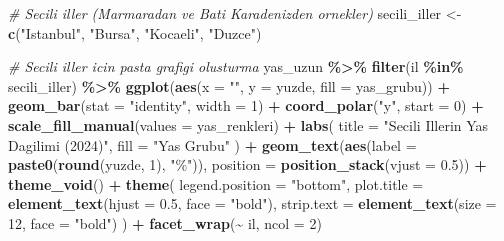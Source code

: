 \documentclass[
]{article}
\newenvironment{Shaded}{\begin{snugshade}}{\end{snugshade}}
\newcommand{\AttributeTok}[1]{\textcolor[rgb]{0.13,0.29,0.53}{#1}}
\newcommand{\CommentTok}[1]{\textcolor[rgb]{0.56,0.35,0.01}{\textit{#1}}}
\newcommand{\DecValTok}[1]{\textcolor[rgb]{0.00,0.00,0.81}{#1}}
\newcommand{\FloatTok}[1]{\textcolor[rgb]{0.00,0.00,0.81}{#1}}
\newcommand{\FunctionTok}[1]{\textcolor[rgb]{0.13,0.29,0.53}{\textbf{#1}}}
\newcommand{\NormalTok}[1]{#1}
\newcommand{\OtherTok}[1]{\textcolor[rgb]{0.56,0.35,0.01}{#1}}
\newcommand{\SpecialCharTok}[1]{\textcolor[rgb]{0.81,0.36,0.00}{\textbf{#1}}}
\newcommand{\StringTok}[1]{\textcolor[rgb]{0.31,0.60,0.02}{#1}}
\begin{document}
\begin{Shaded}
\begin{Highlighting}[]
\CommentTok{\# Secili iller (Marmara\textquotesingle{}dan ve Bati Karadeniz\textquotesingle{}den ornekler)}
\NormalTok{secili\_iller }\OtherTok{\textless{}{-}} \FunctionTok{c}\NormalTok{(}\StringTok{"Istanbul"}\NormalTok{, }\StringTok{"Bursa"}\NormalTok{, }\StringTok{"Kocaeli"}\NormalTok{, }\StringTok{"Duzce"}\NormalTok{)}

\CommentTok{\# Secili iller icin pasta grafigi olusturma}
\NormalTok{yas\_uzun }\SpecialCharTok{\%\textgreater{}\%}
  \FunctionTok{filter}\NormalTok{(il }\SpecialCharTok{\%in\%}\NormalTok{ secili\_iller) }\SpecialCharTok{\%\textgreater{}\%}
  \FunctionTok{ggplot}\NormalTok{(}\FunctionTok{aes}\NormalTok{(}\AttributeTok{x =} \StringTok{""}\NormalTok{, }\AttributeTok{y =}\NormalTok{ yuzde, }\AttributeTok{fill =}\NormalTok{ yas\_grubu)) }\SpecialCharTok{+}
  \FunctionTok{geom\_bar}\NormalTok{(}\AttributeTok{stat =} \StringTok{"identity"}\NormalTok{, }\AttributeTok{width =} \DecValTok{1}\NormalTok{) }\SpecialCharTok{+}
  \FunctionTok{coord\_polar}\NormalTok{(}\StringTok{"y"}\NormalTok{, }\AttributeTok{start =} \DecValTok{0}\NormalTok{) }\SpecialCharTok{+}
  \FunctionTok{scale\_fill\_manual}\NormalTok{(}\AttributeTok{values =}\NormalTok{ yas\_renkleri) }\SpecialCharTok{+}
  \FunctionTok{labs}\NormalTok{(}
    \AttributeTok{title =} \StringTok{"Secili Illerin Yas Dagilimi (2024)"}\NormalTok{,}
    \AttributeTok{fill =} \StringTok{"Yas Grubu"}
\NormalTok{  ) }\SpecialCharTok{+}
  \FunctionTok{geom\_text}\NormalTok{(}\FunctionTok{aes}\NormalTok{(}\AttributeTok{label =} \FunctionTok{paste0}\NormalTok{(}\FunctionTok{round}\NormalTok{(yuzde, }\DecValTok{1}\NormalTok{), }\StringTok{"\%"}\NormalTok{)), }
            \AttributeTok{position =} \FunctionTok{position\_stack}\NormalTok{(}\AttributeTok{vjust =} \FloatTok{0.5}\NormalTok{)) }\SpecialCharTok{+}
  \FunctionTok{theme\_void}\NormalTok{() }\SpecialCharTok{+}
  \FunctionTok{theme}\NormalTok{(}
    \AttributeTok{legend.position =} \StringTok{"bottom"}\NormalTok{,}
    \AttributeTok{plot.title =} \FunctionTok{element\_text}\NormalTok{(}\AttributeTok{hjust =} \FloatTok{0.5}\NormalTok{, }\AttributeTok{face =} \StringTok{"bold"}\NormalTok{),}
    \AttributeTok{strip.text =} \FunctionTok{element\_text}\NormalTok{(}\AttributeTok{size =} \DecValTok{12}\NormalTok{, }\AttributeTok{face =} \StringTok{"bold"}\NormalTok{)}
\NormalTok{  ) }\SpecialCharTok{+}
  \FunctionTok{facet\_wrap}\NormalTok{(}\SpecialCharTok{\textasciitilde{}}\NormalTok{ il, }\AttributeTok{ncol =} \DecValTok{2}\NormalTok{)}
\end{Highlighting}
\end{Shaded}
\end{document}
